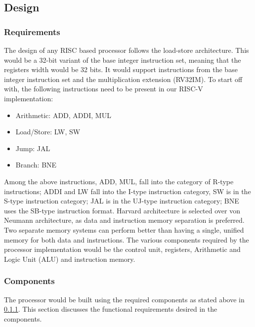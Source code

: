 \subsection{Design}
\label{sect6_4_2}
\subsubsection{Requirements}
\label{section:sect6_4_2_1}
The design of any RISC based processor follows the load-store architecture. This would be a 32-bit variant of the base integer instruction set, meaning that the registers width would be 32 bits. It would support instructions from the base integer instruction set and the multiplication extension (RV32IM). To start off with, the following instructions need to be present in our RISC-V implementation:
\begin{itemize}
\item Arithmetic: ADD, ADDI, MUL
\item Load/Store: LW, SW
\item Jump: JAL
\item Branch: BNE
\end{itemize}
Among the above instructions, ADD, MUL, fall into the category of R-type instructions; ADDI and LW fall into the I-type instruction category, SW is in the S-type instruction category; JAL is in the UJ-type instruction category; BNE uses the SB-type instruction format. \newline\newline
Harvard architecture is selected over von Neumann architecture, as data and instruction memory separation is preferred. Two separate memory systems can perform better than having a single, unified memory for both data and instructions. The various components required by the processor implementation would be the control unit, registers, Arithmetic and Logic Unit (ALU) and instruction memory.

\subsubsection{Components}
\label{sect6_4_2_2}
The processor would be built using the required components as stated above in \ref{section:sect6_4_2_1}. This section discusses the functional requirements desired in the components.

